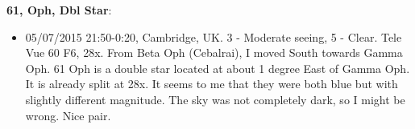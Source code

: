 {\bf 61, Oph, Dbl Star}:
\begin{itemize}
\item 05/07/2015 21:50-0:20, Cambridge, UK. 3 - Moderate seeing, 5 - Clear. Tele Vue 60 F6, 28x. From Beta Oph (Cebalrai), I moved South towards Gamma Oph. 61 Oph is a double star located at about 1 degree East of Gamma Oph. It is already split at 28x. It seems to me that they were both blue but with slightly different magnitude. The sky was not completely dark, so I might be wrong. Nice pair. 
\end{itemize}
